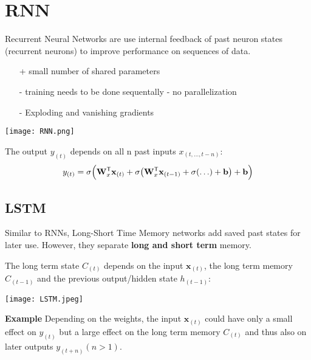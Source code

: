 \section{RNN}\label{sec:RNN} 
Recurrent Neural Networks are use internal feedback of past neuron states (recurrent neurons) to improve performance on sequences of data.
\begin{itemize}
    \item[+] small number of shared parameters
    \item[-] training needs to be done sequentally - no parallelization
    \item[-] Exploding and vanishing gradients
\end{itemize}
\newpar{}
\begin{center}
    \texttt{[image: RNN.png]}
\end{center}
The output $y_{(t)}$ depends on all n past inputs $x_{(t,\ldots,t-n)}$:
\noindent\begin{equation*}
    y_{(t)} = \sigma\Bigl(\mathbf{W}_x^{\mathsf{T}}\mathbf{x}_{(t)} + \sigma\bigl(\mathbf{W}_x^{\mathsf{T}}\mathbf{x}_{(t-1)} + \sigma( \ldots ) + \mathbf{b}\bigr) + \mathbf{b}\Bigr)
\end{equation*}

\subsection{LSTM}
Similar to RNNs, Long-Short Time Memory networks add saved past states for later use. However, they separate \textbf{long and short term} memory.

The long term state $C_{(t)}$ depends on the input $\mathbf{x}_{(t)}$, the long term memory $C_{(t-1)}$ and the previous output/hidden state $h_{(t-1)}$:
\begin{center}
    \texttt{[image: LSTM.jpeg]}
\end{center}

\textbf{Example}
Depending on the weights, the input $\mathbf{x}_{(t)}$ could have only a small effect on $y_{(t)}$ but a large effect on the long term memory $C_{(t)}$ and thus also on later outputs $y_{(t+n)} (n>1)$.